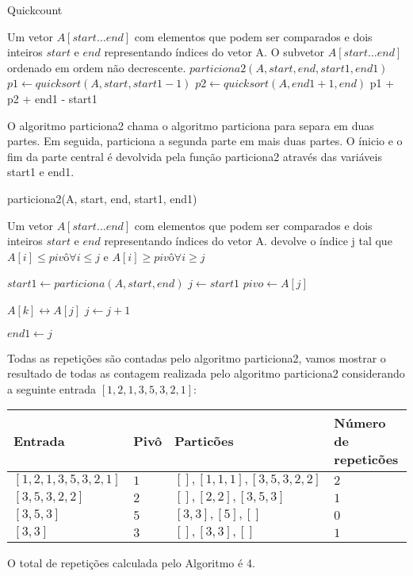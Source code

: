 \begin{algorithm}
\caption{Quickcount}
\label{alg::quickcount}

\begin{algorithmic}
\Require Um vetor $A[start \ldots end]$ com elementos que podem ser comparados e dois inteiros $start$ e $end$ representando índices do vetor A.
\Ensure O subvetor $A[start \ldots end]$ ordenado em ordem não decrescente.
    \State $particiona2(A, start, end, start1, end1)$
    \State $p1 \gets quicksort(A, start, start1-1 )$
    \State $p2 \gets quicksort(A, end1+1, end )$
    \State \Return p1 + p2 + end1 - start1
\Else 
    \State {}
\EndIf

\end{algorithmic}
\end{algorithm}


O algoritmo particiona2 chama o algoritmo particiona para separa em duas partes. Em seguida, particiona a segunda parte em mais duas partes. O ínicio e o fim da parte central é devolvida pela função particiona2 através das variáveis start1 e end1.


\begin{algorithm}
\caption{particiona2(A, start, end, start1, end1)}
\label{alg::particiona}

\begin{algorithmic}
\Require Um vetor $A[start \ldots end]$ com elementos que podem ser comparados e dois inteiros $start$ e $end$ representando índices do vetor A.
\Ensure devolve o índice j tal que $A[i] \leq pivô \forall i \leq j$ e  $A[i] \geq pivô \forall i \geq j$

\State $start1 \gets particiona(A, start, end)$
\State $j \gets start1$
\State $pivo \gets A[j]$

\State $A[k] \leftrightarrow A[j]$
\State $j \gets j + 1$
\EndIf
\EndFor

\State $end1 \gets j$


\end{algorithmic}
\end{algorithm}


Todas as repetições são contadas pelo algoritmo particiona2, vamos mostrar o resultado de todas as contagem realizada pelo algoritmo particiona2 considerando a seguinte entrada  $[1,2,1,3,5,3,2,1]$:

\begin{center}
\begin{tabular}{l|l|l|l}
Entrada & Pivô & Particões & Número de repeticões\\
\hline
$[1,2,1,3,5,3,2,1]$ & $1$ & $[],[1,1,1],[3,5,3,2,2]$ & $2$\\
$[3,5,3,2,2]$ & $2$ & $[],[2,2],[3,5,3]$ & $1$\\
$[3,5,3]$ & $5$ & $[3,3],[5],[]$ & $0$\\
$[3,3]$ & $3$ & $[],[3,3],[]$ & $1$\\


\end{tabular}
\end{center}

O total de repetições calculada pelo Algoritmo é 4.


